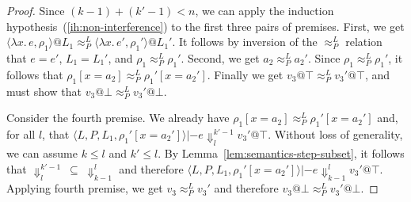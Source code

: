 \documentclass{article}
\makeatletter
\theoremstyle{definition}
\newcommand{\at}{\ensuremath{{\scriptstyle{@}}}}
\newcommand{\pc}{\ensuremath{{\mathit{pc}}}}
\makeatother
\begin{document}
\begin{proof}
  Since $(k-1) + (k'-1) < n$, we can apply the induction
  hypothesis~(\ref{ih:non-interference})
  to the first three pairs of premises.
  First, we get
  $\langle{\lambda{x}.\, e, \rho_1\rangle} \at L_1
  \approx^{L}_{P}
  \langle{\lambda{x}.\, e', \rho_1'\rangle} \at L_1'$.
  It follows by inversion of the $\approx^{L}_{P}$ relation that
  $e = e'$, $L_1 = L_1'$, and $\rho_1 \approx^{L}_{P} \rho_1'$.
  Second, we get $a_2 \approx^{L}_{P} a_2'$.
  Since $\rho_1 \approx^{L}_{P} \rho_1'$, it follows that
  $\rho_1[x = a_2] \approx^{L}_{P} \rho_1'[x = a_2']$.
  Finally we get $v_3 \at \top \approx^{L}_{P} v_3' \at \top$,
  and must show that $v_3 \at \bot \approx^{L}_{P} v_3' \at \bot$.

  Consider the fourth premise.
  We already have $\rho_1[x = a_2] \approx^{L}_{P} \rho_1'[x = a_2']$ and,
  for all $l$, that
  $\langle{L, P, L_1, \rho_1'[x = a_2']\rangle} |- e
  \Downarrow^{k'-1}_{l} v_3' \at \top$.
  Without loss of generality, we can assume $k \leq l$ and $k' \leq l$.
  By Lemma~\ref{lem:semantics-step-subset}, it follows that
  $\Downarrow^{k'-1}_{l}\ \subseteq\ \Downarrow^{l}_{k-1}$ and therefore
  $\langle{L, P, L_1, \rho_1'[x = a_2']\rangle} |- e \Downarrow^{l}_{k-1}
  v_3' \at \top$. Applying fourth premise, we get $v_3 \approx^{L}_{P} v_3'$
  and therefore $v_3 \at \bot \approx^{L}_{P} v_3' \at \bot$.

\end{proof}
\end{document}
